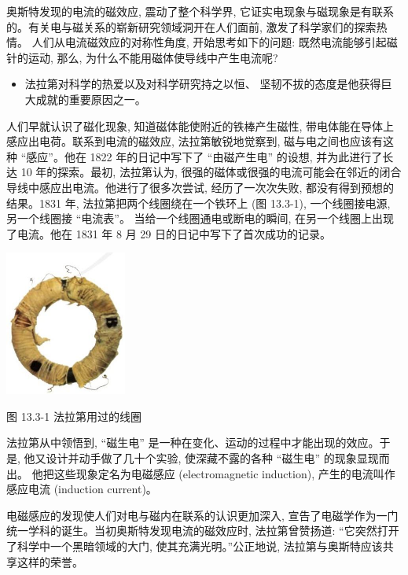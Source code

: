 \documentclass[10pt]{article}
\begin{document}
奥斯特发现的电流的磁效应, 震动了整个科学界, 它证实电现象与磁现象是有联系的。有关电与磁关系的崭新研究领域洞开在人们面前, 激发了科学家们的探索热情。 人们从电流磁效应的对称性角度, 开始思考如下的问题: 既然电流能够引起磁针的运动, 那么, 为什么不能用磁体使导线中产生电流呢?

\begin{mdframed}

\begin{itemize}
\item 法拉第对科学的热爱以及对科学研究持之以恒、 坚韧不拔的态度是他获得巨大成就的重要原因之一。
\end{itemize}

\end{mdframed}

人们早就认识了磁化现象, 知道磁体能使附近的铁棒产生磁性, 带电体能在导体上感应出电荷。联系到电流的磁效应, 法拉第敏锐地觉察到, 磁与电之间也应该有这种 “感应”。他在 1822 年的日记中写下了 “由磁产生电” 的设想, 并为此进行了长达 10 年的探索。最初, 法拉第认为, 很强的磁体或很强的电流可能会在邻近的闭合导线中感应出电流。他进行了很多次尝试, 经历了一次次失败, 都没有得到预想的结果。1831 年, 法拉第把两个线圈绕在一个铁环上 (图 13.3-1), 一个线圈接电源, 另一个线圈接 “电流表”。 当给一个线圈通电或断电的瞬间, 在另一个线圈上出现了电流。他在 1831 年 8 月 29 日的日记中写下了首次成功的记录。

\begin{center}
\includegraphics[max width=0.3\textwidth]{images/01911d5f-8e38-70c0-b5b8-2b399bd115b6_119_341612.jpg}
\end{center}

图 13.3-1 法拉第用过的线圈

法拉第从中领悟到, “磁生电” 是一种在变化、运动的过程中才能出现的效应。于是, 他又设计并动手做了几十个实验, 使深藏不露的各种 “磁生电” 的现象显现而出。 他把这些现象定名为电磁感应 (electromagnetic induction), 产生的电流叫作感应电流 (induction current)。

电磁感应的发现使人们对电与磁内在联系的认识更加深入, 宣告了电磁学作为一门统一学科的诞生。当初奥斯特发现电流的磁效应时, 法拉第曾赞扬道: “它突然打开了科学中一个黑暗领域的大门, 使其充满光明。”公正地说, 法拉第与奥斯特应该共享这样的荣誉。
\end{document}

